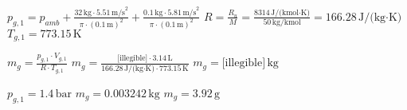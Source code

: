 \( p_{g,1} = p_{amb} + \frac{32 \, \text{kg} \cdot 5.51 \, \text{m/s}^2}{\pi \cdot (0.1 \, \text{m})^2} + \frac{0.1 \, \text{kg} \cdot 5.81 \, \text{m/s}^2}{\pi \cdot (0.1 \, \text{m})^2} \)  
\( R = \frac{R_u}{M} = \frac{8314 \, \text{J/(kmol·K)}}{50 \, \text{kg/kmol}} = 166.28 \, \text{J/(kg·K)} \)  
\( T_{g,1} = 773.15 \, \text{K} \)  

\( m_g = \frac{p_{g,1} \cdot V_{g,1}}{R \cdot T_{g,1}} \)  
\( m_g = \frac{\text{[illegible]} \cdot 3.14 \, \text{L}}{166.28 \, \text{J/(kg·K)} \cdot 773.15 \, \text{K}} \)  
\( m_g = \text{[illegible]} \, \text{kg} \)  

\( p_{g,1} = 1.4 \, \text{bar} \)  
\( m_g = 0.003242 \, \text{kg} \)  
\( m_g = 3.92 \, \text{g} \)
